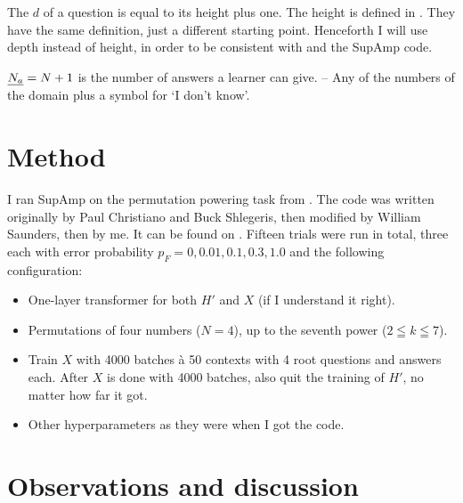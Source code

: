 \documentclass{farlamp}
\begin{document}
The  $d$ of a question is equal to its height plus one. The height
is defined in \Overfail. They have the same definition, just a different
starting point. Henceforth I will use depth instead of height, in order to be
consistent with \textcite{CSASupAmp} and the SupAmp code.

$\underline{N_a} = N + 1$ is the number of answers a learner can give. – Any of the
numbers of the domain plus a symbol for ‘I don't know’.



\section{Method}

I ran SupAmp on the permutation powering task from \textcite{CSASupAmp}. The
code was written originally by Paul Christiano and Buck Shlegeris, then modified
by William Saunders, then by me. It can be found on \AmplificationRepo. Fifteen
trials were run in total, three each with error probability $p_F = 0, 0.01, 0.1,
0.3, 1.0$ and the following configuration:

\begin{itemize}
    \item One-layer transformer for both $H'$ and $X$ (if I understand it
        right).
    \item Permutations of four numbers ($N = 4$), up to the seventh power ($2
        \leqq k \leqq 7$).
    \item Train $X$ with 4000 batches à 50 contexts with 4 root questions and
        answers each. After $X$ is done with 4000 batches, also quit the
        training of $H'$, no matter how far it got.
    \item Other hyperparameters as they were when I got the code.
\end{itemize}



\section{Observations and discussion}
\end{document}
